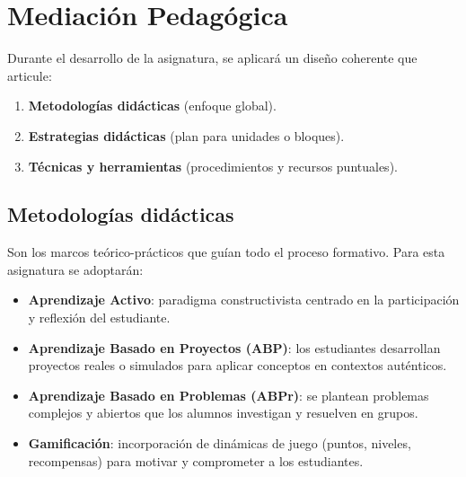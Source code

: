 \section{Mediación Pedagógica}



Durante el desarrollo de la asignatura, se aplicará un diseño coherente que articule:
\begin{enumerate}[leftmargin=*, itemsep=0.6em]
    \item \textbf{Metodologías didácticas} (enfoque global).
    \item \textbf{Estrategias didácticas} (plan para unidades o bloques).
    \item \textbf{Técnicas y herramientas} (procedimientos y recursos puntuales).
\end{enumerate}

\subsection*{Metodologías didácticas}
Son los marcos teórico-prácticos que guían todo el proceso formativo. Para esta asignatura se adoptarán:
\begin{itemize}[leftmargin=*, itemsep=0.6em]
    \item \textbf{Aprendizaje Activo}: paradigma constructivista centrado en la participación y reflexión del estudiante.
    \item \textbf{Aprendizaje Basado en Proyectos (ABP)}: los estudiantes desarrollan proyectos reales o simulados para aplicar conceptos en contextos auténticos.
    \item \textbf{Aprendizaje Basado en Problemas (ABPr)}: se plantean problemas complejos y abiertos que los alumnos investigan y resuelven en grupos.
    \item \textbf{Gamificación}: incorporación de dinámicas de juego (puntos, niveles, recompensas) para motivar y comprometer a los estudiantes.
\end{itemize}

